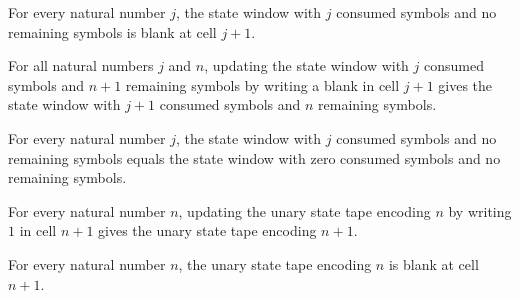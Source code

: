 \begin{lemma}
\label{Turing.universalStateWindow_end}
\leanok
{}
For every natural number $j$, the state window with $j$ consumed symbols and no
remaining symbols is blank at cell $j+1$.
\end{lemma}

\begin{lemma}
\label{Turing.universalStateWindow_erase}
\leanok
{}
For all natural numbers $j$ and $n$, updating the state window with $j$ consumed symbols
and $n+1$ remaining symbols by writing a blank in cell $j+1$ gives the state window with
$j+1$ consumed symbols and $n$ remaining symbols.
\end{lemma}

\begin{lemma}
\label{Turing.universalStateWindow_empty}
\leanok
{}
For every natural number $j$, the state window with $j$ consumed symbols and no
remaining symbols equals the state window with zero consumed symbols and no remaining
symbols.
\end{lemma}

\begin{lemma}
\label{Turing.universalStateTape_append}
\leanok
{}
For every natural number $n$, updating the unary state tape encoding $n$ by writing $1$
in cell $n+1$ gives the unary state tape encoding $n+1$.
\end{lemma}

\begin{lemma}
\label{Turing.universalStateTape_end}
\leanok
{}
For every natural number $n$, the unary state tape encoding $n$ is blank at cell $n+1$.
\end{lemma}

